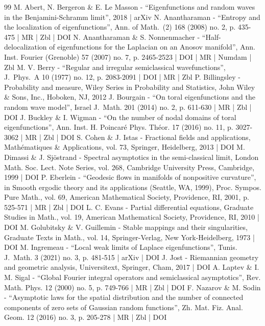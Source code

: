 \begin{thebibliography}{99}
M. Abert, N. Bergeron \& E. Le Masson - “Eigenfunctions and random waves in the Benjamini-Schramm limit”, 2018 | arXiv
N. Anantharaman - “Entropy and the localization of eigenfunctions”, Ann. of Math. (2) 168 (2008) no. 2, p. 435-475 | MR | Zbl | DOI
N. Anantharaman \& S. Nonnenmacher - “Half-delocalization of eigenfunctions for the Laplacian on an Anosov manifold”, Ann. Inst. Fourier (Grenoble) 57 (2007) no. 7, p. 2465-2523 | DOI | MR | Numdam | Zbl
M. V. Berry - “Regular and irregular semiclassical wavefunctions”, J. Phys. A 10 (1977) no. 12, p. 2083-2091 | DOI | MR | Zbl
P. Billingsley - Probability and measure, Wiley Series in Probability and Statistics, John Wiley \& Sons, Inc., Hoboken, NJ, 2012
J. Bourgain - “On toral eigenfunctions and the random wave model”, Israel J. Math. 201 (2014) no. 2, p. 611-630 | MR | Zbl | DOI
J. Buckley \& I. Wigman - “On the number of nodal domains of toral eigenfunctions”, Ann. Inst. H. Poincaré Phys. Théor. 17 (2016) no. 11, p. 3027-3062 | MR | Zbl | DOI
S. Cohen \& J. Istas - Fractional fields and applications, Mathématiques \& Applications, vol. 73, Springer, Heidelberg, 2013 | DOI
M. Dimassi \& J. Sjöstrand - Spectral asymptotics in the semi-classical limit, London Math. Soc. Lect. Note Series, vol. 268, Cambridge University Press, Cambridge, 1999 | DOI
P. Eberlein - “Geodesic flows in manifolds of nonpositive curvature”, in Smooth ergodic theory and its applications (Seattle, WA, 1999), Proc. Sympos. Pure Math., vol. 69, American Mathematical Society, Providence, RI, 2001, p. 525-571 | MR | Zbl | DOI
L. C. Evans - Partial differential equations, Graduate Studies in Math., vol. 19, American Mathematical Society, Providence, RI, 2010 | DOI
M. Golubitsky \& V. Guillemin - Stable mappings and their singularities, Graduate Texts in Math., vol. 14, Springer-Verlag, New York-Heidelberg, 1973 | DOI
M. Ingremeau - “Local weak limits of Laplace eigenfunctions”, Tunis. J. Math. 3 (2021) no. 3, p. 481-515 | arXiv | DOI
J. Jost - Riemannian geometry and geometric analysis, Universitext, Springer, Cham, 2017 | DOI
A. Laptev \& I. M. Sigal - “Global Fourier integral operators and semiclassical asymptotics”, Rev. Math. Phys. 12 (2000) no. 5, p. 749-766 | MR | Zbl | DOI
F. Nazarov \& M. Sodin - “Asymptotic laws for the spatial distribution and the number of connected components of zero sets of Gaussian random functions”, Zh. Mat. Fiz. Anal. Geom. 12 (2016) no. 3, p. 205-278 | MR | Zbl | DOI

\end{thebibliography}
